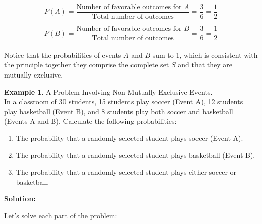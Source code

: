 \documentclass[12pt]{book}
\theoremstyle{definition}
\newtheorem{exmp}{Example}[chapter]
\begin{document}
\[
P(A) = \frac{\text{Number of favorable outcomes for } A}{\text{Total number of outcomes}} = \frac{3}{6} = \frac{1}{2}
\]

\[
P(B) = \frac{\text{Number of favorable outcomes for } B}{\text{Total number of outcomes}} = \frac{3}{6} = \frac{1}{2}
\]\\

Notice that the probabilities of events \(A\) and \(B\) sum to 1, which is consistent with the principle together they comprise the complete set \(S\) and that they are mutually exclusive.\\






\begin{tcolorbox}
    \begin{exmp}{A Problem Involving Non-Mutually Exclusive Events.}\\
        In a classroom of 30 students, 15 students play soccer (Event A), 12 students play basketball (Event B), and 8 students play both soccer and basketball (Events A and B). Calculate the following probabilities:

\begin{enumerate}
    \item The probability that a randomly selected student plays soccer (Event A).
    \item The probability that a randomly selected student plays basketball (Event B).
    \item The probability that a randomly selected student plays either soccer or basketball.
\end{enumerate}

    \end{exmp}
\end{tcolorbox}


\textbf{Solution:}

Let's solve each part of the problem:
\end{document}

